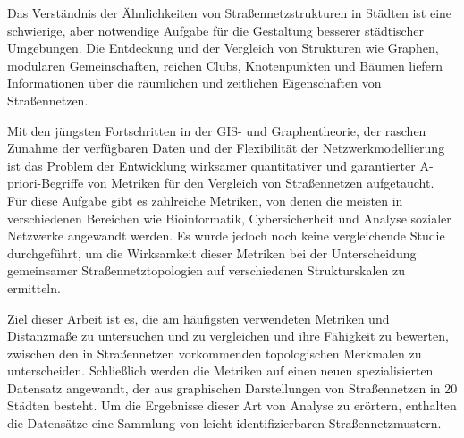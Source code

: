 
Das Verständnis der Ähnlichkeiten von Straßennetzstrukturen in Städten ist eine schwierige, aber notwendige Aufgabe für die Gestaltung besserer städtischer Umgebungen. Die Entdeckung und der Vergleich von Strukturen wie Graphen, modularen Gemeinschaften, reichen Clubs, Knotenpunkten und Bäumen liefern Informationen über die räumlichen und zeitlichen Eigenschaften von Straßennetzen.

Mit den jüngsten Fortschritten in der GIS- und Graphentheorie, der raschen Zunahme der verfügbaren Daten und der Flexibilität der Netzwerkmodellierung ist das Problem der Entwicklung wirksamer quantitativer und garantierter A-priori-Begriffe von Metriken für den Vergleich von Straßennetzen aufgetaucht. Für diese Aufgabe gibt es zahlreiche Metriken, von denen die meisten in verschiedenen Bereichen wie Bioinformatik, Cybersicherheit und Analyse sozialer Netzwerke angewandt werden. Es wurde jedoch noch keine vergleichende Studie durchgeführt, um die Wirksamkeit dieser Metriken bei der Unterscheidung gemeinsamer Straßennetztopologien auf verschiedenen Strukturskalen zu ermitteln.

Ziel dieser Arbeit ist es, die am häufigsten verwendeten Metriken und Distanzmaße zu untersuchen und zu vergleichen und ihre Fähigkeit zu bewerten, zwischen den in Straßennetzen vorkommenden topologischen Merkmalen zu unterscheiden. Schließlich werden die Metriken auf einen neuen spezialisierten Datensatz angewandt, der aus graphischen Darstellungen von Straßennetzen in 20 Städten besteht. Um die Ergebnisse dieser Art von Analyse zu erörtern, enthalten die Datensätze eine Sammlung von leicht identifizierbaren Straßennetzmustern.